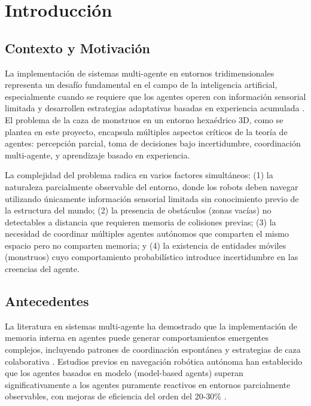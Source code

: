 \documentclass[10pt,twocolumn]{article}
\begin{document}
\section{Introducción}

\subsection{Contexto y Motivación}

La implementación de sistemas multi-agente en entornos tridimensionales representa un desafío fundamental en el campo de la inteligencia artificial, especialmente cuando se requiere que los agentes operen con información sensorial limitada y desarrollen estrategias adaptativas basadas en experiencia acumulada \cite{russell2020}. El problema de la caza de monstruos en un entorno hexaédrico 3D, como se plantea en este proyecto, encapsula múltiples aspectos críticos de la teoría de agentes: percepción parcial, toma de decisiones bajo incertidumbre, coordinación multi-agente, y aprendizaje basado en experiencia.

La complejidad del problema radica en varios factores simultáneos: (1) la naturaleza parcialmente observable del entorno, donde los robots deben navegar utilizando únicamente información sensorial limitada sin conocimiento previo de la estructura del mundo; (2) la presencia de obstáculos (zonas vacías) no detectables a distancia que requieren memoria de colisiones previas; (3) la necesidad de coordinar múltiples agentes autónomos que comparten el mismo espacio pero no comparten memoria; y (4) la existencia de entidades móviles (monstruos) cuyo comportamiento probabilístico introduce incertidumbre en las creencias del agente.

\subsection{Antecedentes}

La literatura en sistemas multi-agente ha demostrado que la implementación de memoria interna en agentes puede generar comportamientos emergentes complejos, incluyendo patrones de coordinación espontánea y estrategias de caza colaborativa \cite{russell2020}. Estudios previos en navegación robótica autónoma han establecido que los agentes basados en modelo (model-based agents) superan significativamente a los agentes puramente reactivos en entornos parcialmente observables, con mejoras de eficiencia del orden del 20-30\% \cite{wooldridge2009}.
\end{document}
